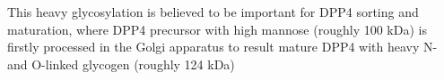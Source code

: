 This heavy glycosylation is believed to be important for DPP4 sorting and maturation, where DPP4 precursor with high mannose (roughly 100 kDa) is firstly processed in the Golgi apparatus to result mature DPP4 with heavy N- and O-linked glycogen (roughly 124 kDa)~\cite{Matter_1991}